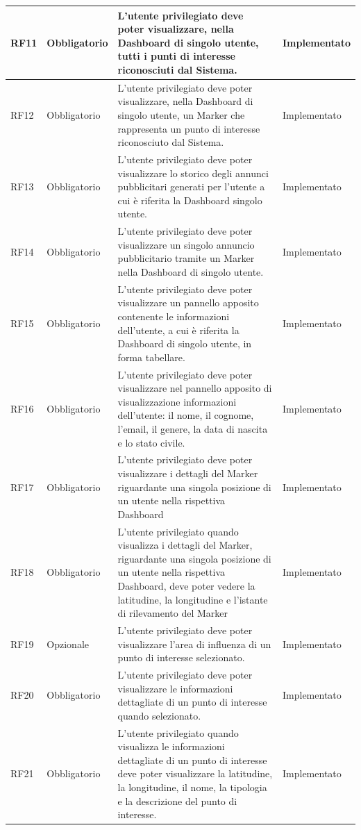 \documentclass[10pt]{article}
\begin{document}
\begin{longtable}{|>{\centering\arraybackslash}m{2.7cm}|>{\centering\arraybackslash}m{2.7cm}|>{\raggedright\arraybackslash}m{6cm}|>{\centering\arraybackslash}m{2.1cm}|}
    \hline
    RF11 & Obbligatorio & L'utente privilegiato deve poter visualizzare, nella Dashboard di singolo utente, tutti i punti di interesse riconosciuti dal Sistema. & Implementato \\
    \hline
    RF12 & Obbligatorio & L'utente privilegiato deve poter visualizzare, nella Dashboard di singolo utente, un Marker che rappresenta un punto di interesse riconosciuto dal Sistema. & Implementato \\
    \hline
    RF13 & Obbligatorio & L'utente privilegiato deve poter visualizzare lo storico degli annunci pubblicitari generati per l'utente a cui è riferita la Dashboard singolo utente. & Implementato \\
    \hline
    RF14 & Obbligatorio & L'utente privilegiato deve poter visualizzare un singolo annuncio pubblicitario tramite un Marker nella Dashboard di singolo utente. & Implementato \\
    \hline
    RF15 & Obbligatorio & L'utente privilegiato deve poter visualizzare un pannello apposito contenente le informazioni dell'utente, a cui è riferita la Dashboard di singolo utente, in forma tabellare. & Implementato \\
    \hline
    RF16 & Obbligatorio & L'utente privilegiato deve poter visualizzare nel pannello apposito di visualizzazione informazioni dell'utente: il nome, il cognome, l'email, il genere, la data di nascita e lo stato civile. & Implementato \\
    \hline
    RF17 & Obbligatorio & L'utente privilegiato deve poter visualizzare i dettagli del Marker riguardante una singola posizione di un utente nella rispettiva Dashboard & Implementato \\
    \hline
    RF18 & Obbligatorio & L'utente privilegiato quando visualizza i dettagli del Marker, riguardante una singola posizione di un utente nella rispettiva Dashboard, deve poter vedere la latitudine, la longitudine e l'istante di rilevamento del Marker & Implementato \\
    \hline
    RF19 & Opzionale & L'utente privilegiato deve poter visualizzare l'area di influenza di un punto di interesse selezionato. & Implementato \\
    \hline
    RF20 & Obbligatorio & L'utente privilegiato deve poter visualizzare le informazioni dettagliate di un punto di interesse quando selezionato. & Implementato \\
    \hline
    RF21 & Obbligatorio & L'utente privilegiato quando visualizza le informazioni dettagliate di un punto di interesse deve poter visualizzare la latitudine, la longitudine, il nome, la tipologia e la descrizione del punto di interesse. & Implementato \\

\end{longtable}
\end{document}
